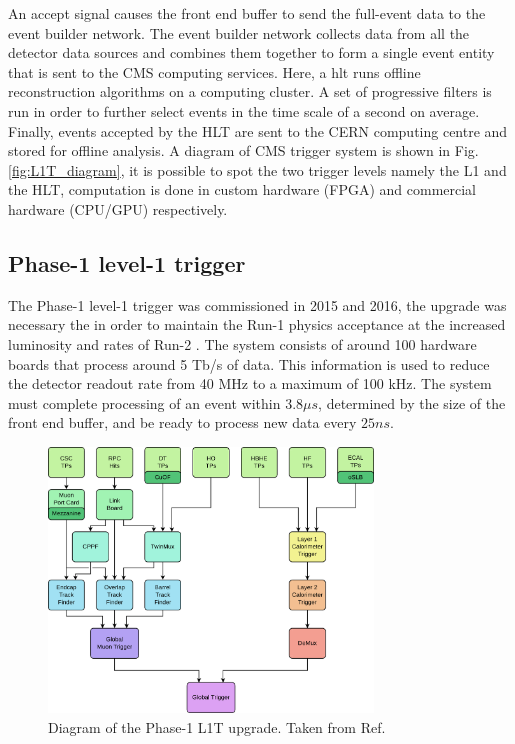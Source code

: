 \documentclass[../../main.tex]{subfiles}
\begin{document}
An accept signal causes the front end buffer to send the full-event data to the event builder network. The event builder network collects data from all the detector data sources and combines them together to form a single event entity that is sent to the CMS computing services. Here, a \acrfull{hlt} runs offline reconstruction algorithms on a computing cluster. A set of
progressive filters is run in order to further select events in the time scale of a second on average.
Finally, events accepted by the HLT are sent to the CERN computing centre and stored for offline analysis. A diagram of CMS trigger system is shown in Fig. \ref{fig:L1T_diagram}, it is possible to spot the two trigger levels namely the L1 and the HLT, computation is done in custom hardware (FPGA) and commercial hardware (CPU/GPU) respectively.

\subsection{Phase-1 level-1 trigger}
\label{Phase-1_l1T}

The Phase-1 level-1 trigger was commissioned in 2015 and 2016, the upgrade was necessary the in order to maintain the Run-1 physics acceptance at the increased luminosity and rates of
Run-2 \cite{L1T-1up}. The system consists of around 100 hardware boards that process around 5 Tb/s of data. This information is used to reduce the detector readout rate from 40 MHz to a maximum of
100 kHz. The system must complete processing of an event within $3.8 \mu s$, determined by the size of the front end buffer, and be ready to process new data every $25 ns$.


\begin{figure}[h]
    \centering
    \includegraphics[width=0.77\textwidth]{sections/02/Images/Phase-1_l1t.pdf}
    \caption{Diagram of the Phase-1 L1T upgrade. Taken from Ref. \cite{L1T-1up}}
    \label{fig:Phase-1_L1T}
\end{figure}
\end{document}
